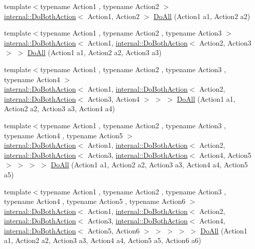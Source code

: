 \begin{DoxyCompactItemize}
\item 
{\footnotesize template$<$typename Action1 , typename Action2 $>$ }\\\hyperlink{classtesting_1_1internal_1_1DoBothAction}{internal\+::\+Do\+Both\+Action}$<$ Action1, Action2 $>$ \hyperlink{namespacetesting_a5f533932753d2af95000e96c4a3042e3}{Do\+All} (Action1 a1, Action2 a2)
\item 
{\footnotesize template$<$typename Action1 , typename Action2 , typename Action3 $>$ }\\\hyperlink{classtesting_1_1internal_1_1DoBothAction}{internal\+::\+Do\+Both\+Action}$<$ Action1, \hyperlink{classtesting_1_1internal_1_1DoBothAction}{internal\+::\+Do\+Both\+Action}$<$ Action2, Action3 $>$ $>$ \hyperlink{namespacetesting_ad6a3ce5e229120ea287286a86394d712}{Do\+All} (Action1 a1, Action2 a2, Action3 a3)
\item 
{\footnotesize template$<$typename Action1 , typename Action2 , typename Action3 , typename Action4 $>$ }\\\hyperlink{classtesting_1_1internal_1_1DoBothAction}{internal\+::\+Do\+Both\+Action}$<$ Action1, \hyperlink{classtesting_1_1internal_1_1DoBothAction}{internal\+::\+Do\+Both\+Action}$<$ Action2, \hyperlink{classtesting_1_1internal_1_1DoBothAction}{internal\+::\+Do\+Both\+Action}$<$ Action3, Action4 $>$ $>$ $>$ \hyperlink{namespacetesting_a790ce08c80a1f8ececa0f2a4f678247c}{Do\+All} (Action1 a1, Action2 a2, Action3 a3, Action4 a4)
\item 
{\footnotesize template$<$typename Action1 , typename Action2 , typename Action3 , typename Action4 , typename Action5 $>$ }\\\hyperlink{classtesting_1_1internal_1_1DoBothAction}{internal\+::\+Do\+Both\+Action}$<$ Action1, \hyperlink{classtesting_1_1internal_1_1DoBothAction}{internal\+::\+Do\+Both\+Action}$<$ Action2, \hyperlink{classtesting_1_1internal_1_1DoBothAction}{internal\+::\+Do\+Both\+Action}$<$ Action3, \hyperlink{classtesting_1_1internal_1_1DoBothAction}{internal\+::\+Do\+Both\+Action}$<$ Action4, Action5 $>$ $>$ $>$ $>$ \hyperlink{namespacetesting_a794c41d43373d7af9cebbc7f1c5e4a57}{Do\+All} (Action1 a1, Action2 a2, Action3 a3, Action4 a4, Action5 a5)
\item 
{\footnotesize template$<$typename Action1 , typename Action2 , typename Action3 , typename Action4 , typename Action5 , typename Action6 $>$ }\\\hyperlink{classtesting_1_1internal_1_1DoBothAction}{internal\+::\+Do\+Both\+Action}$<$ Action1, \hyperlink{classtesting_1_1internal_1_1DoBothAction}{internal\+::\+Do\+Both\+Action}$<$ Action2, \hyperlink{classtesting_1_1internal_1_1DoBothAction}{internal\+::\+Do\+Both\+Action}$<$ Action3, \hyperlink{classtesting_1_1internal_1_1DoBothAction}{internal\+::\+Do\+Both\+Action}$<$ Action4, \hyperlink{classtesting_1_1internal_1_1DoBothAction}{internal\+::\+Do\+Both\+Action}$<$ Action5, Action6 $>$ $>$ $>$ $>$ $>$ \hyperlink{namespacetesting_aa6c87c8d7520fb333f1559487d3e06e9}{Do\+All} (Action1 a1, Action2 a2, Action3 a3, Action4 a4, Action5 a5, Action6 a6)

\end{DoxyCompactItemize}
